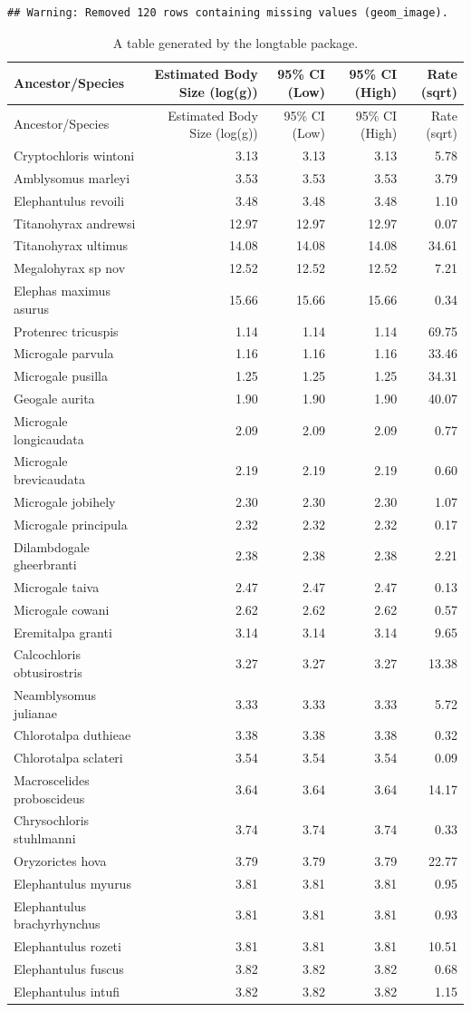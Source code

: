 \documentclass[10pt,letterpaper]{article}
\begin{document}
\begin{verbatim}
## Warning: Removed 120 rows containing missing values (geom_image).
\end{verbatim}

\begin{longtable}[]{@{}lrrrr@{}}
\caption{A table generated by the longtable package.}\tabularnewline
\toprule
Ancestor/Species & Estimated Body Size (log(g)) & 95\% CI (Low) & 95\%
CI (High) & Rate (sqrt)\tabularnewline
\midrule
\endfirsthead
\toprule
Ancestor/Species & Estimated Body Size (log(g)) & 95\% CI (Low) & 95\%
CI (High) & Rate (sqrt)\tabularnewline
\midrule
\endhead
Cryptochloris wintoni & 3.13 & 3.13 & 3.13 & 5.78\tabularnewline
Amblysomus marleyi & 3.53 & 3.53 & 3.53 & 3.79\tabularnewline
Elephantulus revoili & 3.48 & 3.48 & 3.48 & 1.10\tabularnewline
Titanohyrax andrewsi & 12.97 & 12.97 & 12.97 & 0.07\tabularnewline
Titanohyrax ultimus & 14.08 & 14.08 & 14.08 & 34.61\tabularnewline
Megalohyrax sp nov & 12.52 & 12.52 & 12.52 & 7.21\tabularnewline
Elephas maximus asurus & 15.66 & 15.66 & 15.66 & 0.34\tabularnewline
Protenrec tricuspis & 1.14 & 1.14 & 1.14 & 69.75\tabularnewline
Microgale parvula & 1.16 & 1.16 & 1.16 & 33.46\tabularnewline
Microgale pusilla & 1.25 & 1.25 & 1.25 & 34.31\tabularnewline
Geogale aurita & 1.90 & 1.90 & 1.90 & 40.07\tabularnewline
Microgale longicaudata & 2.09 & 2.09 & 2.09 & 0.77\tabularnewline
Microgale brevicaudata & 2.19 & 2.19 & 2.19 & 0.60\tabularnewline
Microgale jobihely & 2.30 & 2.30 & 2.30 & 1.07\tabularnewline
Microgale principula & 2.32 & 2.32 & 2.32 & 0.17\tabularnewline
Dilambdogale gheerbranti & 2.38 & 2.38 & 2.38 & 2.21\tabularnewline
Microgale taiva & 2.47 & 2.47 & 2.47 & 0.13\tabularnewline
Microgale cowani & 2.62 & 2.62 & 2.62 & 0.57\tabularnewline
Eremitalpa granti & 3.14 & 3.14 & 3.14 & 9.65\tabularnewline
Calcochloris obtusirostris & 3.27 & 3.27 & 3.27 & 13.38\tabularnewline
Neamblysomus julianae & 3.33 & 3.33 & 3.33 & 5.72\tabularnewline
Chlorotalpa duthieae & 3.38 & 3.38 & 3.38 & 0.32\tabularnewline
Chlorotalpa sclateri & 3.54 & 3.54 & 3.54 & 0.09\tabularnewline
Macroscelides proboscideus & 3.64 & 3.64 & 3.64 & 14.17\tabularnewline
Chrysochloris stuhlmanni & 3.74 & 3.74 & 3.74 & 0.33\tabularnewline
Oryzorictes hova & 3.79 & 3.79 & 3.79 & 22.77\tabularnewline
Elephantulus myurus & 3.81 & 3.81 & 3.81 & 0.95\tabularnewline
Elephantulus brachyrhynchus & 3.81 & 3.81 & 3.81 & 0.93\tabularnewline
Elephantulus rozeti & 3.81 & 3.81 & 3.81 & 10.51\tabularnewline
Elephantulus fuscus & 3.82 & 3.82 & 3.82 & 0.68\tabularnewline
Elephantulus intufi & 3.82 & 3.82 & 3.82 & 1.15\tabularnewline

\end{longtable}
\end{document}
